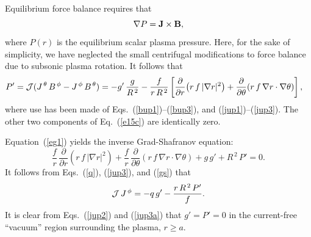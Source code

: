\documentclass[12pt,prb,aps]{revtex4-1}
\begin{document}
Equilibrium force balance requires that
\begin{equation}\label{e15c}
 \nabla P={\bf J}\times {\bf B},
\end{equation}
where $P(r)$ is the equilibrium scalar plasma pressure. Here, for the sake of simplicity, we have neglected the small centrifugal modifications to force balance due to subsonic plasma
rotation.\cite{flow,flow1}
It follows that 
\begin{align}\label{eg1}
P'&= {\cal J}(J^{\,\theta}\,B^{\,\phi}-J^{\,\phi}\,B^{\,\theta})= -g'\,\frac{g}{R^{\,2}} - \frac{f}{r\,R^{\,2}}\left[\frac{\partial}{\partial r}\!\left(r\,f\,|\nabla r|^2\right)+ \frac{\partial}{\partial\theta}\!\left(r\,f\,\nabla r\cdot\nabla\theta\right)\right],
\end{align}
where use has been made of Eqs.~(\ref{bup1})--(\ref{bup3}), and  (\ref{jup1})--(\ref{jup3}). The
other two components of Eq.~(\ref{e15c}) are identically zero. 

Equation~(\ref{eg1}) yields the inverse Grad-Shafranov equation:\cite{connor}
\begin{equation}\label{gs}
\frac{f}{r}\,\frac{\partial}{\partial r}\!\left(r\,f\,|\nabla r|^2\right) +\frac{f}{r}\,\frac{\partial}{\partial\theta}\!\left(r\,f\,\nabla r\cdot\nabla\theta\right)+g\,g' + R^{\,2}\,P'=0.
\end{equation}
It follows from Eqs.~(\ref{q}), (\ref{jup3}), and (\ref{gs}) that
\begin{equation}\label{jup3a}
{\cal J}\,J^{\,\phi} = -q\,g' - \frac{r\,R^{\,2}\,P'}{f}.
\end{equation}
It is clear from Eqs.~(\ref{jup2}) and (\ref{jup3a}) that $g'=P'=0$ in the  current-free ``vacuum'' region surrounding the plasma, $r\geq a$. 
\end{document}
